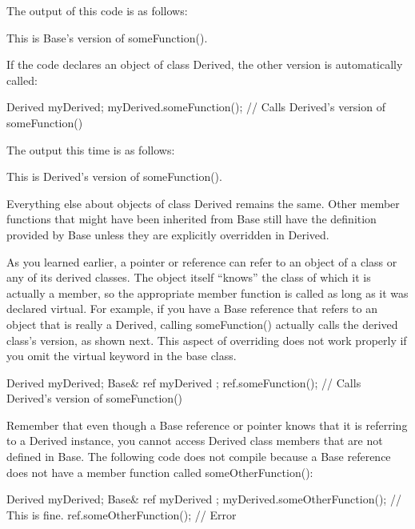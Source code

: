 The output of this code is as follows:

\begin{shell}
This is Base's version of someFunction().
\end{shell}

If the code declares an object of class Derived, the other version is automatically called:

\begin{cpp}
Derived myDerived;
myDerived.someFunction(); // Calls Derived's version of someFunction()
\end{cpp}

The output this time is as follows:

\begin{shell}
This is Derived's version of someFunction().
\end{shell}

Everything else about objects of class Derived remains the same. Other member functions that might have been inherited from Base still have the definition provided by Base unless they are explicitly overridden in Derived.

As you learned earlier, a pointer or reference can refer to an object of a class or any of its derived classes. The object itself “knows” the class of which it is actually a member, so the appropriate member function is called as long as it was declared virtual. For example, if you have a Base reference that refers to an object that is really a Derived, calling someFunction() actually calls the derived class’s version, as shown next. This aspect of overriding does not work properly if you omit the virtual keyword in the base class.

\begin{cpp}
Derived myDerived;
Base& ref { myDerived };
ref.someFunction(); // Calls Derived's version of someFunction()
\end{cpp}

Remember that even though a Base reference or pointer knows that it is referring to a Derived instance, you cannot access Derived class members that are not defined in Base. The following code does not compile because a Base reference does not have a member function called someOtherFunction():

\begin{cpp}
Derived myDerived;
Base& ref { myDerived };
myDerived.someOtherFunction(); // This is fine.
ref.someOtherFunction(); // Error
\end{cpp}

